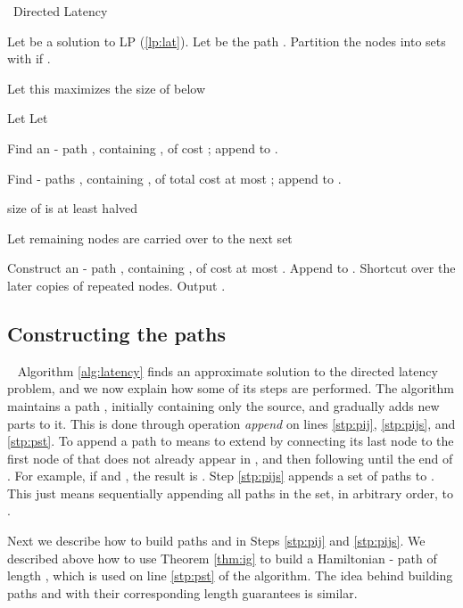 \documentclass[11pt]{article}
\begin{document}
\begin{algorithm*}[ht]
  \caption{~Directed Latency} \label{alg:latency} 
\begin{algorithmic}[1] 
\State Let  be a solution to LP (\ref{lp:lat}). Let  be the path .
\State Partition the nodes into 
sets  with  if .
\label{stp:forloop}
\If {}

\State Let  \label{step:vij}
\Comment this maximizes the size of  below

\State Let 
\State Let 
\Comment 

\State Find an - path , containing , of cost ; append  to . \label{stp:pij}

\State Find  - paths , containing , of total cost at most 
; append  to . \label{stp:pijs}

\State  \label{stp:decv}
\Comment size of  is at least halved

\EndIf
\EndFor
\State Let  \label{stp:move-nodes}
\Comment remaining nodes are carried over to the next set

\EndFor
\State Construct an - path , containing , of cost at most .  Append  to . \label{stp:pst}
\State Shortcut  over the later copies of repeated nodes. Output .

\end{algorithmic}
\end{algorithm*}

\subsection{Constructing the paths}~
Algorithm \ref{alg:latency} finds an approximate solution to the directed latency problem, and we now explain how some of its steps are performed. The algorithm maintains a path , initially containing only the source, and gradually adds new parts to it. This is done through operation \emph{append} on lines \ref{stp:pij}, \ref{stp:pijs}, and \ref{stp:pst}. To append a path  to  means to extend  by connecting its last node to the first node of  that does not already appear in , and then following until the end of . For example, if  and , the result is . Step \ref{stp:pijs} appends a set of paths to . This just means sequentially appending all paths in the set, in arbitrary order, to .


Next we describe how to build paths  and  in Steps \ref{stp:pij} and \ref{stp:pijs}. We described above how to use Theorem \ref{thm:ig} to build a Hamiltonian - path  of length , which is used on line \ref{stp:pst} of the algorithm.  The idea behind building paths  and  with their corresponding length guarantees is similar.
\end{document}
